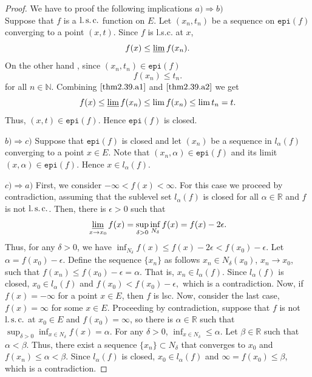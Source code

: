     \begin{proof}
    We have to proof the following implications 
    \textbf{$a) \Rightarrow b)$} \\
        Suppose that $f$ is a $\operatorname{l.s.c.}$ function on $E$. Let 
        $(x_n, t_n)$ be a sequence on $\mathtt{epi}(f)$ converging to a point 
        $(x,t)$. Since $f$ is l.s.c. at $x$,
        \begin{equation}\label{thm2.39.a1}
            f(x) \leq \varliminf f(x_n).
        \end{equation}
        On the other hand , since $(x_n, t_n) \in \mathtt{epi}(f)$ 
        \begin{equation}\label{thm2.39.a2}
            f(x_n) \leq t_n.
        \end{equation}
        for all $n \in \mathbb{N}$. Combining $\eqref{thm2.39.a1}$ and
        $\eqref{thm2.39.a2}$ we get 
        $$
            f(x) \leq \varliminf f(x_n) \leq \lim f(x_n) \leq \lim t_n = t.
        $$
        Thus, $(x,t) \in \mathtt{epi}(f)$. Hence $\mathtt{epi}(f)$ is closed.
        
    \textbf{$b) \Rightarrow c)$}
        Suppose that $\mathtt{epi}(f)$ is closed and let $(x_n)$ be a sequence in
        $l_{\alpha}(f)$ converging to a point $x \in E$. Note that 
        $(x_n, \alpha) \in \mathtt{epi}(f)$ and its limit $(x, \alpha) \in \mathtt{epi}(f)$. 
        Hence $x \in l_{\alpha}(f)$.
        
    \textbf{$c) \Rightarrow a)$}
        First, we consider $-\infty < f(x) < \infty$. For this case we proceed by
        contradiction, assuming that the sublevel set $l_{\alpha}(f)$  
        is closed for all $\alpha \in \mathbb{R}$ and $f$ is not $\operatorname{l.s.c.}$.
        Then, there is $\epsilon > 0$ such that
        $$
            \varliminf_{x \to x_0} f(x) = \sup_{\delta >0} \inf_{N_{\delta}} f(x)
            = f(x) - 2\epsilon.
        $$
        Thus, for any $\delta > 0$, we have 
        $
            \inf_{N_\delta} f(x) \leq f(x) - 2\epsilon < f(x_0) - \epsilon.
        $
        Let $\alpha = f(x_0) - \epsilon$. Define the sequence $\{x_n\}$ as 
        follows $x_n \in N_{\delta}(x_0)$, $x_n \to x_0$,
        such that $f(x_n) \leq f(x_0) - \epsilon = \alpha $. That is, 
        $x_n \in l_{\alpha}(f)$. Since $l_{\alpha}(f)$ is closed, 
        $x_0 \in l_{\alpha}(f)$ and 
        $
            f(x_0) < f(x_0) - \epsilon,
        $
        which is a contradiction. Now, if $f(x) = -\infty$ for a point $x \in E$, then
        $f$ is lsc. Now, consider the last case, $f(x) = \infty$ for some $x \in E$. 
        Proceeding by contradiction, suppose that $f$ is not $\operatorname{l.s.c.}$ at 
        $x_0 \in E$ and $f(x_0) = \infty$, so there is $\alpha \in \mathbb{R}$ 
        such that $\sup_{\delta > 0} \inf_{x \in N_{\delta}} f(x) = \alpha$. 
        For any $\delta >0$, $\inf_{x \in N_{\delta}} \leq \alpha$. Let 
        $\beta \in \mathbb{R}$ such that $\alpha < \beta$. Thus, there exist a 
        sequence $\{x_n\} \subset N_{\delta}$ that converges to $x_0$ and $f(x_n) %
        \leq \alpha < \beta$. Since $l_{\alpha}(f)$ is closed, 
        $x_0 \in l_{\alpha}(f)$ and $\infty = f(x_0) \leq \beta$,
        which is a contradiction. 
    \end{proof}
